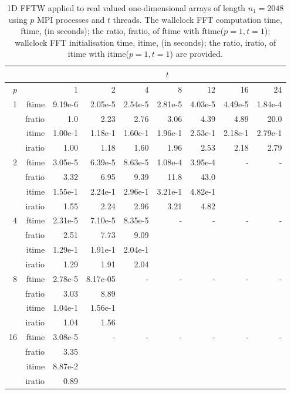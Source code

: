 \documentclass[a4]{article}
\begin{document}
\begin{table}
\begin{center}
\begin{tabular}{|r|r|r|r|r|r|r|r|r|}
\hline 
     &  & \multicolumn{7}{c|}{$t$} \\ \hline
    $p$  &  & 1           & 2    & 4    & 8    & 12   & 16    & 24  \\ \hline\hline
    1  & ftime & 9.19e-6 & 2.05e-5 & 2.54e-5 &  2.81e-5 &   4.03e-5 &   4.49e-5 &  1.84e-4 \\ 
      & fratio & 1.0 & 2.23 & 2.76 &  3.06 &   4.39 &  4.89 &  20.0 \\ 
     & itime &  1.00e-1 &   1.18e-1 &   1.60e-1 &   1.96e-1 &   2.53e-1 &   2.18e-1 &   2.79e-1   \\ 
     & iratio &  1.00 &    1.18 &    1.60 &    1.96 &    2.53 &    2.18 &    2.79   \\ \hline
    2  & ftime & 3.05e-5 &  6.39e-5 &  8.63e-5 &  1.08e-4 &  3.95e-4 & - & - \\ 
      & fratio & 3.32 &  6.95 &  9.39 &  11.8 &   43.0 &  &  \\
      & itime &   1.55e-1 &   2.24e-1 &   2.96e-1 &   3.21e-1 &   4.82e-1   &  &  \\
      & iratio &  1.55 &    2.24 &    2.96 &    3.21 &    4.82    &  &  \\ \hline
    4  & ftime &  2.31e-5 &  7.10e-5  & 8.35e-5 & - & - & - & - \\ 
      & fratio & 2.51 &  7.73  & 9.09 &  &  &  &  \\
      & itime &   1.29e-1 &   1.91e-1 &   2.04e-1    &  & & & \\
      & iratio &  1.29 &    1.91 &    2.04    &  & & &  \\ \hline
    8  & ftime & 2.78e-5 &  8.17e-05 & - & - & - & - & - \\ 
      & fratio & 3.03 &  8.89 &  &  &  &  &  \\
      & itime &   1.04e-1 &   1.56e-1    &  & & & & \\
      & iratio & 1.04 &    1.56    &  & & & & \\ \hline
    16 & ftime  & 3.08e-5 & - & - & - & - & - & - \\ 
     & fratio & 3.35 &  &  &  &  &  &  \\
      & itime &   8.87e-2   & & & & & & \\
      & iratio &   0.89  & & & & & & \\ \hline
\end{tabular}
\caption{1D FFTW applied to real valued one-dimensional arrays of length $n_1=2048$ using $p$ MPI processes and $t$ threads. The wallclock FFT computation time, ftime, (in seconds); the ratio, fratio, of ftime  with ftime($p=1,t=1$); wallclock FFT initialisation time, itime, (in seconds); the ratio, iratio, of itime  with itime($p=1,t=1$) are provided.}\label{Tbl:FFT1d2048}
\end{center}
\end{table}
\end{document}
